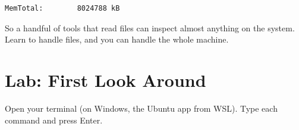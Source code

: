 \begin{codeblock}

\begin{Shaded}
\begin{Highlighting}[]
 
\end{Highlighting}
\end{Shaded}

\end{codeblock}

\begin{codeblock}
\begin{Verbatim}[formatcom=\outputstyle]
MemTotal:        8024788 kB
\end{Verbatim}
\end{codeblock}

So a handful of tools that read files can inspect almost anything on the system. Learn to handle files, and you can handle the whole machine.

\section{Lab: First Look Around}\label{01-the-machine-behind-the-terminal:lab-first-look-around}

Open your terminal (on Windows, the Ubuntu app from WSL). Type each command and press Enter.

